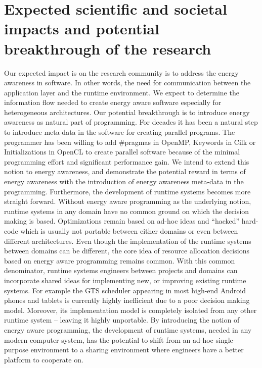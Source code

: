 \documentclass{article}
\begin{document}
\section{Expected scientific and societal impacts and potential breakthrough of the research}
Our expected impact is on the research community is to address the energy awareness in software. 
In other words, the need for communication between the application layer and the runtime environment. 
We expect to determine the information flow needed to create energy aware software especially for heterogeneous architectures. 
Our potential breakthrough is to introduce energy awareness as natural part of programming. 
For decades it has been a natural step to introduce meta-data in the software for creating parallel programs. 
The programmer has been willing to add \#pragmas in OpenMP, Keywords in Cilk or Initializations in OpenCL to create parallel software because of the minimal programming effort and significant performance gain. 
We intend to extend this notion to energy awareness, and demonstrate the potential reward in terms of energy awareness with the introduction of energy awareness meta-data in the programming. 
Furthermore, the development of runtime systems becomes more straight forward. 
Without energy aware programming as the underlying notion, runtime systems in any domain have no common ground on which the decision making is based. 
Optimizations remain based on ad-hoc ideas and “hacked” hard-code which is usually not portable between either domains or even between different architectures. 
Even though the implementation of the runtime systems between domains can be different, the core idea of resource allocation decisions based on energy aware programming remains common. 
With this common denominator, runtime systems engineers between projects and domains can incorporate shared ideas for implementing new, or improving existing runtime systems. 
For example the GTS scheduler appearing in most high-end Android phones and tablets is currently highly inefficient due to a poor decision making model. 
Moreover, its implementation model is completely isolated from any other runtime system – leaving it highly unportable. 
By introducing the notion of energy aware programming, the development of runtime systems, needed in any modern computer system, has the potential to shift from an ad-hoc single-purpose environment to a sharing environment where engineers have a better platform to cooperate on.
\end{document}
